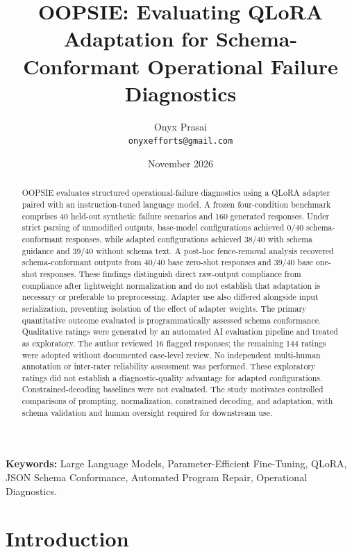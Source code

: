 \documentclass[11pt,a4paper]{article}
\title{\textbf{OOPSIE: Evaluating QLoRA Adaptation for Schema-Conformant Operational Failure Diagnostics}}
\author{
  Onyx Prasai \\
  \texttt{onyxefforts@gmail.com}
}
\date{November 2026}
\begin{document}
\maketitle

\begin{abstract}
OOPSIE evaluates structured operational-failure diagnostics using a QLoRA adapter paired with an instruction-tuned language model. A frozen four-condition benchmark comprises 40 held-out synthetic failure scenarios and 160 generated responses. Under strict parsing of unmodified outputs, base-model configurations achieved 0/40 schema-conformant responses, while adapted configurations achieved 38/40 with schema guidance and 39/40 without schema text. A post-hoc fence-removal analysis recovered schema-conformant outputs from 40/40 base zero-shot responses and 39/40 base one-shot responses. These findings distinguish direct raw-output compliance from compliance after lightweight normalization and do not establish that adaptation is necessary or preferable to preprocessing. Adapter use also differed alongside input serialization, preventing isolation of the effect of adapter weights. The primary quantitative outcome evaluated is programmatically assessed schema conformance. Qualitative ratings were generated by an automated AI evaluation pipeline and treated as exploratory. The author reviewed 16 flagged responses; the remaining 144 ratings were adopted without documented case-level review. No independent multi-human annotation or inter-rater reliability assessment was performed. These exploratory ratings did not establish a diagnostic-quality advantage for adapted configurations. Constrained-decoding baselines were not evaluated. The study motivates controlled comparisons of prompting, normalization, constrained decoding, and adaptation, with schema validation and human oversight required for downstream use.
\end{abstract}

\textbf{Keywords:} Large Language Models, Parameter-Efficient Fine-Tuning, QLoRA, JSON Schema Conformance, Automated Program Repair, Operational Diagnostics.

\section{Introduction}
\end{document}
